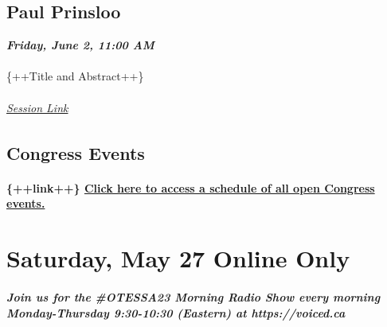 \documentclass[
]{book}
\begin{document}
\hypertarget{paul-prinsloo}{%
\section*{Paul Prinsloo}\label{paul-prinsloo}}

\textbf{\emph{Friday, June 2, 11:00 AM}}

\begin{keynote}
\hypertarget{section}{%
\subsubsection{}\label{section}}

\{++Title and Abstract++\}

\hypertarget{session-link}{%
\subparagraph{\texorpdfstring{\href{}{Session
Link}}{Session Link}}\label{session-link}}
\end{keynote}

\hypertarget{congress-events}{%
\section*{Congress Events}\label{congress-events}}

\begin{feedback}
\hypertarget{link-click-here-to-access-a-schedule-of-all-open-congress-events.}{%
\subsubsection{\texorpdfstring{\{++link++\} \href{}{Click here to access
a schedule of all open Congress
events.}}{\{++link++\} Click here to access a schedule of all open Congress events.}}\label{link-click-here-to-access-a-schedule-of-all-open-congress-events.}}
\end{feedback}

\hypertarget{saturday-may-27-online-only}{%
\chapter{Saturday, May 27 \textbar{} Online Only}\label{saturday-may-27-online-only}}

\begin{protip}
\hypertarget{join-us-for-the-otessa23-morning-radio-show-every-morning-monday-thursday-930-1030-eastern-at-httpsvoiced.ca}{%
\paragraph{Join us for the \#OTESSA23 Morning Radio Show every morning
Monday-Thursday 9:30-10:30 (Eastern) at
https://voiced.ca}\label{join-us-for-the-otessa23-morning-radio-show-every-morning-monday-thursday-930-1030-eastern-at-httpsvoiced.ca}}
\end{protip}
\end{document}
